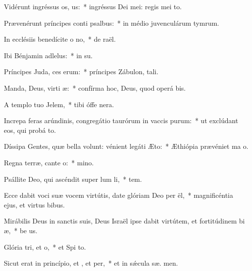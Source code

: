 \item Vidérunt ingréssus os, us:~* ingréssus Dei mei: regis mei    to.
\item Prævenérunt príncipes conti psalbus:~* in médio juvenculárum tymrum.
\item In ecclésiis benedícite o no,~* de  raël.
\item Ibi Bénjamin adlelus:~* in  su.
\item Príncipes Juda, ces erum:~* príncipes Zábulon,  tali.
\item Manda, Deus, virti æ:~* confírma hoc, Deus, quod operá   bis.
\item A templo tuo  Jelem,~* tibi óffe  nera.
\item Increpa feras arúndinis, congregátio taurórum in vaccis purum:~* ut exclúdant eos, qui probá  to.
\item Díssipa Gentes, quæ bella volunt: vénient legáti  Æto:~* Æthiópia prævéniet ma  o.
\item Regna terræ, cante o:~*  mino.
\item Psállite Deo, qui ascéndit super lum li,~*  tem.
\item Ecce dabit voci suæ vocem virtútis, date glóriam Deo per ël,~* magnificéntia ejus, et virtus   bibus.
\item Mirábilis Deus in sanctis suis, Deus Israël ipse dabit virtútem, et fortitúdinem bi æ,~* be us.
\item Glória tri, et o,~* et Spi to.
\item Sicut erat in princípio, et , et per,~* et in sǽcula sæ. men.
